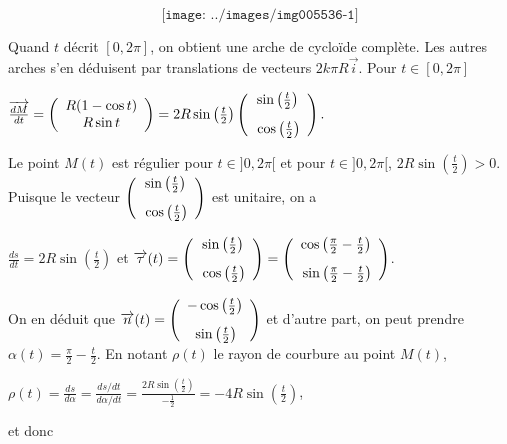 {\begin{enumerate}
{$$\texttt{[image: ../images/img005536-1]}$$

 \item  Quand $t$ décrit $[0,2\pi]$, on obtient une arche de cycloïde complète. Les autres arches s'en déduisent par translations de vecteurs $2k\pi R\overrightarrow{i}$. Pour $t\in[0,2\pi]$

\begin{center}
$\overrightarrow{\frac{dM}{dt}}=\left(
\begin{array}{c}
R(1-\cos t)\\
R\sin t
\end{array}
\right)=2R\sin\left(\frac{t}{2}\right)\left(
\begin{array}{c}
\sin\left(\frac{t}{2}\right)\\
\rule{0mm}{6mm}\cos\left(\frac{t}{2}\right)
\end{array}
\right).$
\end{center}
Le point $M(t)$ est régulier pour $t\in]0,2\pi[$ et pour $t\in]0,2\pi[$, $2R\sin\left(\frac{t}{2}\right)>0$. Puisque le vecteur $\left(
\begin{array}{c}
\sin\left(\frac{t}{2}\right)\\
\rule{0mm}{6mm}\cos\left(\frac{t}{2}\right)
\end{array}
\right)$ est unitaire, on a

\begin{center}
$\frac{ds}{dt}=2R\sin\left(\frac{t}{2}\right)$ et $\overrightarrow{\tau}(t)=\left(
\begin{array}{c}
\sin\left(\frac{t}{2}\right)\\
\rule{0mm}{6mm}\cos\left(\frac{t}{2}\right)
\end{array}
\right)=\left(
\begin{array}{c}
\cos\left(\frac{\pi}{2}-\frac{t}{2}\right)\\
\rule{0mm}{6mm}\sin\left(\frac{\pi}{2}-\frac{t}{2}\right)
\end{array}
\right)$.
\end{center}
On en déduit que $\overrightarrow{n}(t)=\left(
\begin{array}{c}
-\cos\left(\frac{t}{2}\right)\\
\rule{0mm}{6mm}\sin\left(\frac{t}{2}\right)
\end{array}
\right)$ et d'autre part, on peut prendre $\alpha(t)=\frac{\pi}{2}-\frac{t}{2}$. En notant $\rho(t)$ le rayon de courbure au point $M(t)$,

\begin{center}
$\rho(t)=\frac{ds}{d\alpha}=\frac{ds/dt}{d\alpha/dt}=\frac{2R\sin\left(\frac{t}{2}\right)}{-\frac{1}{2}}=-4R\sin\left(\frac{t}{2}\right)$,
\end{center}
et donc

}
\end{enumerate}}
